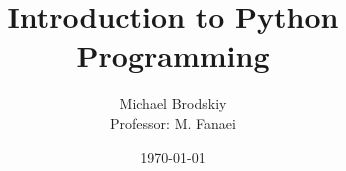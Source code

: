 


\title{Introduction to Python Programming}
\date{\today}
\author{Michael Brodskiy\\ \small Professor: M. Fanaei}



\maketitle

